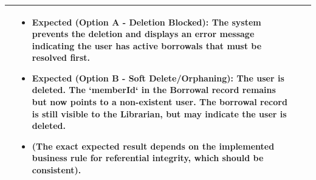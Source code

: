 \begin{longtable}{|>{\scriptsize\raggedright\arraybackslash}p{2cm}|>{\raggedright\arraybackslash}p{4cm}|>{\raggedright\arraybackslash}p{5cm}|>{\raggedright\arraybackslash}p{4.5cm}|}
\begin{itemize}[noitemsep, topsep=0pt, partopsep=0pt, leftmargin=*]
    \end{itemize} & 
    \begin{itemize}[noitemsep, topsep=0pt, partopsep=0pt, leftmargin=*]
        \item \textbf{Expected (Option A - Deletion Blocked):} The system prevents the deletion and displays an error message indicating the user has active borrowals that must be resolved first.
        \item \textbf{Expected (Option B - Soft Delete/Orphaning):} The user is deleted. The `memberId` in the Borrowal record  remains but now points to a non-existent user. The borrowal record is still visible to the Librarian, but may indicate the user is deleted.
        \item (The exact expected result depends on the implemented business rule for referential integrity, which should be consistent).
    \end{itemize} \\ \hline


\end{longtable}
